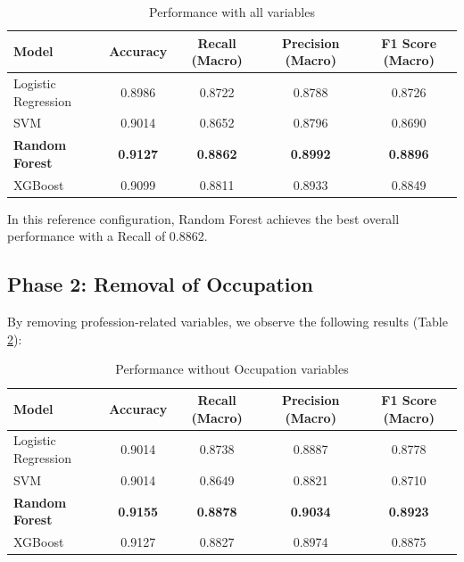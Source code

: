\documentclass[12pt,a4paper]{article}
\begin{document}
    \begin{table}[H]
        \centering
        \begin{tabular}{|l|c|c|c|c|}
            \hline
            \textbf{Model} & \textbf{Accuracy} & \textbf{Recall (Macro)} & \textbf{Precision (Macro)} & \textbf{F1 Score (Macro)} \\
            \hline
            Logistic Regression & 0.8986 & 0.8722 & 0.8788 & 0.8726 \\
            SVM & 0.9014 & 0.8652 & 0.8796 & 0.8690 \\
            \textbf{Random Forest} & \textbf{0.9127} & \textbf{0.8862} & \textbf{0.8992} & \textbf{0.8896} \\
            XGBoost & 0.9099 & 0.8811 & 0.8933 & 0.8849 \\
            \hline
        \end{tabular}
        \caption{Performance with all variables}
        \label{tab:results_all}
    \end{table}

    In this reference configuration, Random Forest achieves the best overall performance with a Recall of 0.8862.

    \subsection{Phase 2: Removal of Occupation}
    By removing profession-related variables, we observe the following results (Table \ref{tab:results_no_occ}):

    \begin{table}[H]
        \centering
        \begin{tabular}{|l|c|c|c|c|}
            \hline
            \textbf{Model} & \textbf{Accuracy} & \textbf{Recall (Macro)} & \textbf{Precision (Macro)} & \textbf{F1 Score (Macro)} \\
            \hline
            Logistic Regression & 0.9014 & 0.8738 & 0.8887 & 0.8778 \\
            SVM & 0.9014 & 0.8649 & 0.8821 & 0.8710 \\
            \textbf{Random Forest} & \textbf{0.9155} & \textbf{0.8878} & \textbf{0.9034} & \textbf{0.8923} \\
            XGBoost & 0.9127 & 0.8827 & 0.8974 & 0.8875 \\
            \hline
        \end{tabular}
        \caption{Performance without Occupation variables}
        \label{tab:results_no_occ}
    \end{table}
\end{document}
